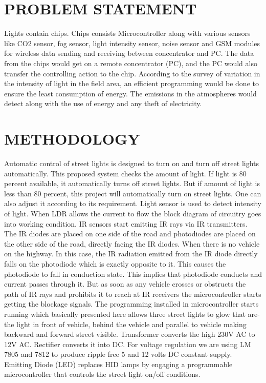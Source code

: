 \documentclass[conference]{IEEEtran}
\begin{document}
\section{PROBLEM STATEMENT}
Lights contain chips. Chips consists Microcontroller
along with various sensors like CO2 sensor, fog sensor,
light intensity sensor, noise sensor and GSM modules
for wireless data sending and receiving between
concentrator and PC. The data from the chips would
get on a remote concentrator (PC), and the PC would
also transfer the controlling action to the chip.
According to the survey of variation in the intensity
of light in the field area, an efficient programming
would be done to ensure the least consumption of
energy. The emissions in the atmospheres would
detect along with the use of energy and any theft of
electricity.

\section{METHODOLOGY}


Automatic control of street lights is designed to turn
on and turn off street lights automatically. This
proposed system checks the amount of light. If light
is 80 percent available, it automatically turns off
street lights. But if amount of light is less than 80
percent, this project will automatically turn on street
lights. One can also adjust it according to its
requirement. Light sensor is used to detect intensity
of light. When LDR allows the current to flow the
block diagram of circuitry goes into working
condition. IR sensors start emitting IR rays via IR
transmitters. The IR diodes are placed on one side of
the road and photodiodes are placed on the other side of the road, directly facing the IR diodes. When
there is no vehicle on the highway. In this case, the
IR radiation emitted from the IR diode directly falls
on the photodiode which is exactly opposite to it.
This causes the photodiode to fall in conduction state.
This implies that photodiode conducts and current
passes through it. But as soon as any vehicle crosses
or obstructs the path of IR rays and prohibits it to
reach at IR receivers the microcontroller starts
getting the blockage signals. The programming
installed in microcontroller starts running which
basically presented here allows three street lights to
glow that are- the light in front of vehicle, behind
the vehicle and parallel to vehicle making backward
and forward street visible. Transformer converts the
high 230V AC to 12V AC. Rectifier converts it into
DC. For voltage regulation we are using LM 7805
and 7812 to produce ripple free 5 and 12 volts DC
constant supply. Emitting Diode (LED) replaces HID
lamps by engaging a programmable microcontroller
that controls the street light on/off conditions.
\end{document}
